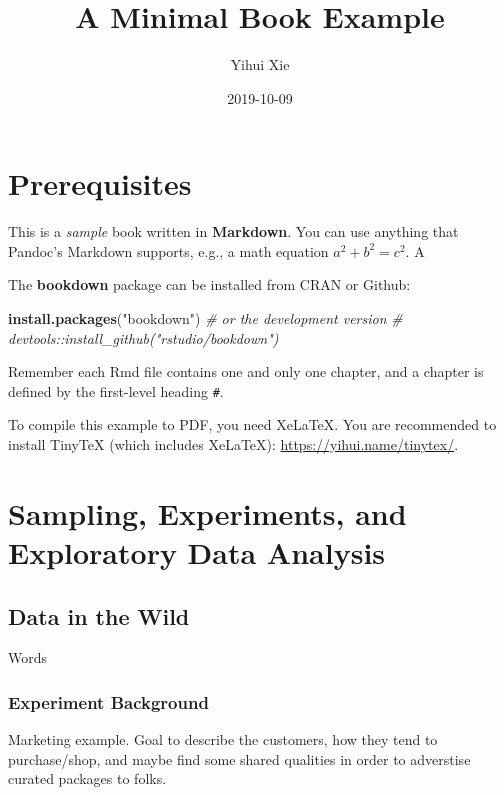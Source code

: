 \documentclass[]{book}
\title{A Minimal Book Example}
\author{Yihui Xie}
\date{2019-10-09}
\newenvironment{Shaded}{\begin{snugshade}}{\end{snugshade}}
\newcommand{\KeywordTok}[1]{\textcolor[rgb]{0.13,0.29,0.53}{\textbf{#1}}}
\newcommand{\StringTok}[1]{\textcolor[rgb]{0.31,0.60,0.02}{#1}}
\newcommand{\CommentTok}[1]{\textcolor[rgb]{0.56,0.35,0.01}{\textit{#1}}}
\newcommand{\NormalTok}[1]{#1}
\begin{document}
\maketitle

{
\setcounter{tocdepth}{1}
\tableofcontents
}
\chapter{Prerequisites}\label{prerequisites}

This is a \emph{sample} book written in \textbf{Markdown}. You can use
anything that Pandoc's Markdown supports, e.g., a math equation
\(a^2 + b^2 = c^2\). A

The \textbf{bookdown} package can be installed from CRAN or Github:

\begin{Shaded}
\begin{Highlighting}[]
\KeywordTok{install.packages}\NormalTok{(}\StringTok{"bookdown"}\NormalTok{)}
\CommentTok{# or the development version}
\CommentTok{# devtools::install_github("rstudio/bookdown")}
\end{Highlighting}
\end{Shaded}

Remember each Rmd file contains one and only one chapter, and a chapter
is defined by the first-level heading \texttt{\#}.

To compile this example to PDF, you need XeLaTeX. You are recommended to
install TinyTeX (which includes XeLaTeX):
\url{https://yihui.name/tinytex/}.

\chapter{Sampling, Experiments, and Exploratory Data
Analysis}\label{sampling-experiments-and-exploratory-data-analysis}

\section{Data in the Wild}\label{data-in-the-wild}

Words

\subsection{Experiment Background}\label{experiment-background}

Marketing example. Goal to describe the customers, how they tend to
purchase/shop, and maybe find some shared qualities in order to
adverstise curated packages to folks.
\end{document}
